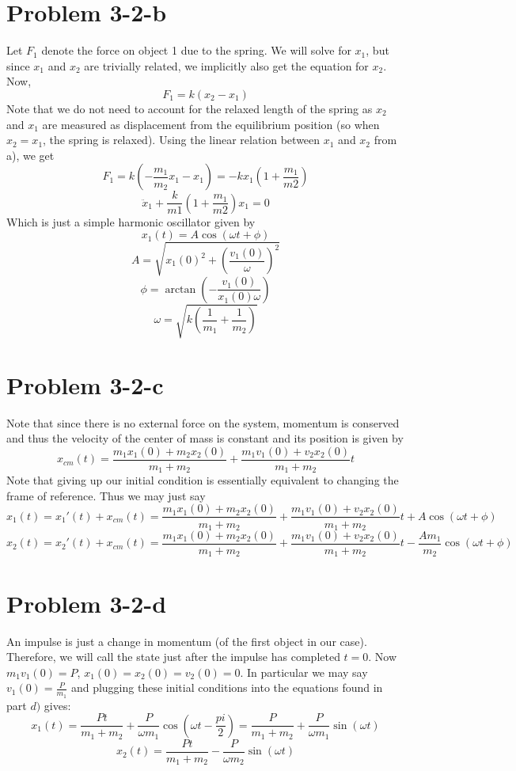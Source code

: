 \section*{Problem 3-2-b}
Let $F_1$ denote the force on object 1 due to the spring. We will solve for $x_1$, but since $x_1$ and $x_2$ are trivially related, we implicitly also get the equation for $x_2$. 
Now, 
\[ F_1 = k(x_2-x_1) \]
Note that we do not need to account for the relaxed length of the spring as $x_2$ and $x_1$ are measured as displacement from the equilibrium position (so when $x_2=x_1$, the spring is relaxed). Using the linear relation between $x_1$ and $x_2$ from a), we get 
\[ F_1 = k\left(-\frac{m_1}{m_2}x_1 - x_1\right) = -kx_1\left(1+\frac{m_1}{m2}\right) \]
\[ \ddot{x}_1 + \frac{k}{m1}\left(1+\frac{m_1}{m2}\right)x_1 = 0 \]
Which is just a simple harmonic oscillator given by 
\[ x_1(t) = A\cos(\omega t + \phi) \]
\[ A = \sqrt{x_1(0)^2+\left(\frac{v_1(0)}{\omega}\right)^2} \]
\[ \phi = \arctan\left(-\frac{v_1(0)}{x_1(0)\omega}\right) \]
\[ \omega = \sqrt{k\left(\frac{1}{m_1}+\frac{1}{m_2}\right)} \]
\section*{Problem 3-2-c}
Note that since there is no external force on the system, momentum is conserved and thus the velocity of the center of mass is constant and its position is given by 
\[ x_{cm}(t) = \dfrac{m_1x_1(0)+m_2x_2(0)}{m_1+m_2} + \dfrac{m_1v_1(0)+v_2x_2(0)}{m_1+m_2} t\]
Note that giving up our initial condition is essentially equivalent to changing the frame of reference. Thus we may just say
\[ x_1(t) = x_1'(t) + x_{cm}(t) = \dfrac{m_1x_1(0)+m_2x_2(0)}{m_1+m_2} + \dfrac{m_1v_1(0)+v_2x_2(0)}{m_1+m_2} t +  A\cos(\omega t + \phi) \]
\[ x_2(t) = x_2'(t) + x_{cm}(t) = \dfrac{m_1x_1(0)+m_2x_2(0)}{m_1+m_2} + \dfrac{m_1v_1(0)+v_2x_2(0)}{m_1+m_2} t - \frac{Am_1}{m_2}\cos(\omega t + \phi) \]
\section*{Problem 3-2-d}
An impulse is just a change in momentum (of the first object in our case). Therefore, we will call the state just after the impulse has completed $t=0$. Now $m_1v_1(0) = P$, $x_1(0)=x_2(0)=v_2(0)=0$. In particular we may say $v_1(0) = \frac{P}{m_1}$ and plugging these initial conditions into the equations found in part $d)$ gives:
\[ x_1(t) = \frac{P t}{m_1+m_2} + \frac{P}{\omega m_1}\cos(\omega t-\frac{pi}{2}) = \frac{P}{m_1+m_2} + \frac{P}{\omega m_1}\sin(\omega t) \]
\[ x_2(t) =  \frac{P t}{m_1+m_2} - \frac{P}{\omega m_2}\sin(\omega t) \]
